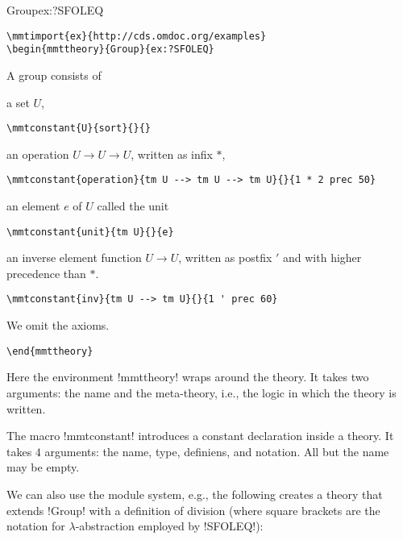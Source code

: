 \begin{mmttheory}{Group}{ex:?SFOLEQ}
\begin{lstlisting}
\mmtimport{ex}{http://cds.omdoc.org/examples}
\begin{mmttheory}{Group}{ex:?SFOLEQ}
\end{lstlisting}

A group consists of
\begin{compactitem}
 \item a set $U$,
\begin{lstlisting}
\mmtconstant{U}{sort}{}{}
\end{lstlisting}

 \item an operation $U\to U \to U$, written as infix $*$,
\begin{lstlisting}
\mmtconstant{operation}{tm U --> tm U --> tm U}{}{1 * 2 prec 50}
\end{lstlisting}

 \item an element $e$ of $U$ called the unit
\begin{lstlisting}
\mmtconstant{unit}{tm U}{}{e}
\end{lstlisting}

\item an inverse element function $U\to U$, written as postfix $'$ and with higher precedence than $*$.
\begin{lstlisting}
\mmtconstant{inv}{tm U --> tm U}{}{1 ' prec 60}
\end{lstlisting}
\end{compactitem}
We omit the axioms.

\end{mmttheory}
\begin{lstlisting}
\end{mmttheory}
\end{lstlisting}

Here the environment !mmttheory! wraps around the theory.
It takes two arguments: the name and the meta-theory, i.e., the logic in which the theory is written.

The macro !mmtconstant! introduces a constant declaration inside a theory.
It takes $4$ arguments: the name, type, definiens, and notation. All but the name may be empty.

We can also use the \mmt module system, e.g., the following creates a theory that extends !Group! with a definition of division (where square brackets are the notation for $\lambda$-abstraction employed by !SFOLEQ!):

